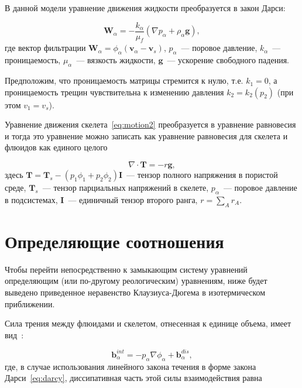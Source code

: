 В данной модели уравнение движения жидкости преобразуется в закон Дарси:

\begin{equation}
  \label{eq:darcy}
  {\textbf{W}}_{\alpha} = - \frac{k_{\alpha}}{\mu_f} (\nabla p_{\alpha} + \rho_{\alpha}\textbf{g}),
\end{equation}
где вектор фильтрации ${\textbf{W}}_{\alpha} = \phi_{\alpha} ({\textbf{v}}_{\alpha} - {\textbf{v}}_s)$, $p_{\alpha}$~--- поровое давление, $k_{\alpha}$~--- проницаемость, $\mu_{\alpha}$~--- вязкость жидкости, $\textbf{g}$~--- ускорение свободного падения.

Предположим, что проницаемость матрицы стремится к нулю, т.е. $k_1 = 0$, а проницаемость трещин чувствительна к изменению давления $k_2 = k_2(p_2)$ (при этом $v_1 = v_s$).

Уравнение движения скелета~\eqref{eq:motion2} преобразуется в уравнение равновесия и тогда это уравнение можно записать как уравнение равновесия для скелета и флюидов как единого целого

\begin{equation}
  \label{eq:seqaulity}
  \nabla \cdot {\textbf{T}} = - r {\textbf{g}},
\end{equation}
здесь ${\textbf{T}} = {\textbf{T}}_s - (p_1 \phi_1 + p_2 \phi_2) \textbf{I}$~--- тензор полного напряжения в пористой среде, ${\textbf{T}}_s$~--- тензор парциальных напряжений в скелете, $p_{\alpha}$~--- поровое давление в подсистемах, $\textbf{I}$~--- единичный тензор второго ранга, $r = \sum_{A} {r_A}$.

\section{Определяющие соотношения}\label{sec:ch1/sec02}

Чтобы перейти непосредственно к замыкающим систему уравнений~ определяющим (или по-другому реологическим) уравнениям, ниже будет выведено приведенное неравенство Клаузиуса-Дюгема в изотермическом приближении.

Сила трения между флюидами и скелетом, отнесенная к единице объема, имеет вид~\autocite{kondaurov2007, coussy2004poromechanics}:

\begin{equation}
  \label{eq:bint}
  \textbf{b}^{int}_{\alpha} = - p_{\alpha} \nabla \phi_{\alpha} + \textbf{b}^{dis}_{\alpha},
\end{equation}
где, в случае использования линейного закона течения в форме закона Дарси~\eqref{eq:darcy}, диссипативная часть этой силы взаимодействия равна

